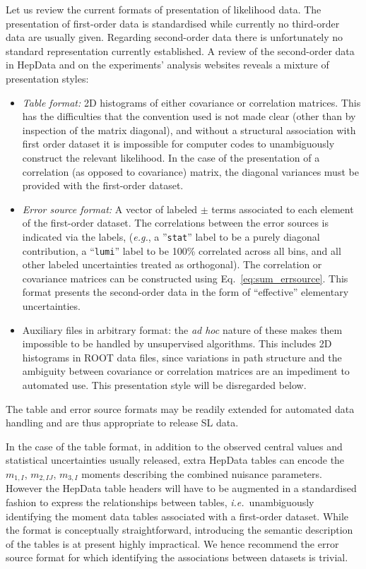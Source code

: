 \documentclass[11pt]{article}
\def\ie{{\it i.e.}}
\def\eg{{\it e.g.}}
\begin{document}
Let us review the current formats of presentation of likelihood data. The presentation
of first-order data is standardised while currently no third-order data are usually given.
Regarding second-order data there is unfortunately no standard representation
currently established.  A review of the second-order data in HepData 
and on the experiments' analysis websites reveals a
mixture of presentation styles:
%
\begin{itemize}
\item \textit{Table format:} 2D histograms of either covariance or correlation
  matrices. This has the difficulties that the convention used is not made clear
  (other than by inspection of the matrix diagonal), and without a structural
  association with first order dataset it is impossible for computer codes to
  unambiguously construct the relevant likelihood. In the case of the
  presentation of a correlation (as opposed to covariance) matrix, the diagonal
  variances must be provided with the first-order dataset.

\item \textit{Error source format:} A vector of labeled $\pm$ terms associated
  to each element of the first-order dataset. The correlations between the error
  sources is indicated via the labels, (\eg, a ''\texttt{stat}'' label to be a
  purely diagonal contribution, a ``\texttt{lumi}'' label to be 100\% correlated
  across all bins, and all other labeled uncertainties treated as orthogonal).
  The correlation or covariance matrices can be constructed using Eq.~\eqref{eq:sum_errsource}.
  This format presents the second-order data in the form of ``effective''
  elementary uncertainties.

\item Auxiliary files in arbitrary format: the \emph{ad hoc} nature of these
  makes them impossible to be handled by unsupervised algorithms. This includes
  2D histograms in ROOT data files, since variations in path structure and the
  ambiguity between covariance or correlation matrices are an impediment to
  automated use. This presentation style will be disregarded below.
\end{itemize}
%
The table and error source formats  may be readily extended for automated data
handling and are thus appropriate to release SL data.

In the case of the table format, in addition to the observed central values and
statistical uncertainties usually released, extra HepData tables can encode the
$m_{1,I}$, $m_{2,IJ}$, $m_{3,I}$ moments describing the combined nuisance
parameters.  However the HepData table headers will have to be augmented in a
standardised fashion to express the relationships between tables,
\ie\ unambiguously identifying the moment data tables associated with a
first-order dataset. While the format is conceptually straightforward,
introducing the semantic description of the tables is at present highly
impractical. We hence recommend the error source format for which identifying
the associations between datasets is trivial.
\end{document}
